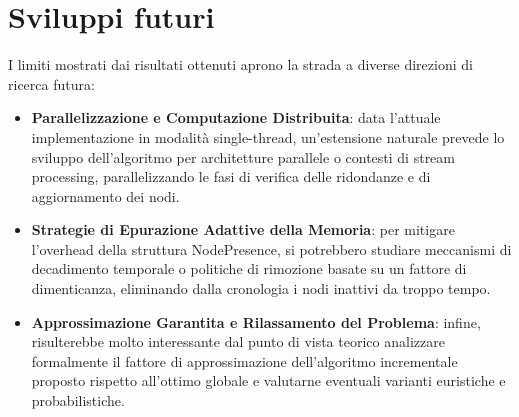 \section{Sviluppi futuri}

I limiti mostrati dai risultati ottenuti aprono la strada a diverse direzioni di ricerca futura:
\begin{itemize}
    \item \textbf{Parallelizzazione e Computazione Distribuita}: data l'attuale implementazione in modalità single-thread, un'estensione naturale prevede lo sviluppo dell'algoritmo per architetture parallele o contesti di stream processing, parallelizzando le fasi di verifica delle ridondanze e di aggiornamento dei nodi.
    \item \textbf{Strategie di Epurazione Adattive della Memoria}: per mitigare l'overhead della struttura NodePresence, si potrebbero studiare meccanismi di decadimento temporale o politiche di rimozione basate su un fattore di dimenticanza, eliminando dalla cronologia i nodi inattivi da troppo tempo.
    \item \textbf{Approssimazione Garantita e Rilassamento del Problema}: infine, risulterebbe molto interessante dal punto di vista teorico analizzare formalmente il fattore di approssimazione dell'algoritmo incrementale proposto rispetto all'ottimo globale e valutarne eventuali varianti euristiche e probabilistiche.
\end{itemize}